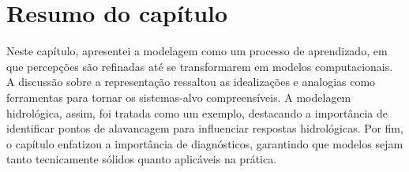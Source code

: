 \documentclass[./main.tex]{subfiles}
\begin{document}
\clearpage

\section{Resumo do capítulo} \label{sec:sys:summary}

\par Neste capítulo, apresentei a modelagem como um processo de aprendizado, em que percepções são refinadas até se transformarem em modelos computacionais. A discussão sobre a representação ressaltou as idealizações e analogias como ferramentas para tornar os sistemas-alvo compreensíveis. A modelagem hidrológica, assim, foi tratada como um exemplo, destacando a importância de identificar pontos de alavancagem para influenciar respostas hidrológicas. Por fim, o capítulo enfatizou a importância de diagnósticos, garantindo que modelos sejam tanto tecnicamente sólidos quanto aplicáveis na prática.
\end{document}
